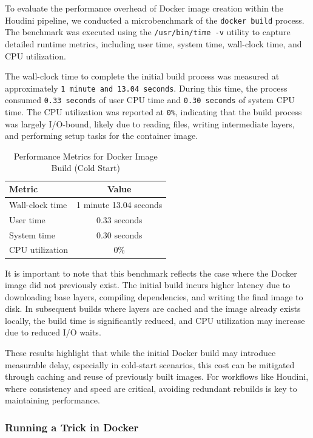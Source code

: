\documentclass[12pt]{report}
\begin{document}
\begin{doublespace}
To evaluate the performance overhead of Docker image creation within the Houdini pipeline, we conducted a microbenchmark of the \texttt{docker build} process. The benchmark was executed using the \texttt{/usr/bin/time -v} utility to capture detailed runtime metrics, including user time, system time, wall-clock time, and CPU utilization.

The wall-clock time to complete the initial build process was measured at approximately \texttt{1 minute and 13.04 seconds}. During this time, the process consumed \texttt{0.33 seconds} of user CPU time and \texttt{0.30 seconds} of system CPU time. The CPU utilization was reported at \texttt{0\%}, indicating that the build process was largely I/O-bound, likely due to reading files, writing intermediate layers, and performing setup tasks for the container image.

\begin{table}[h]
\centering
\caption{Performance Metrics for Docker Image Build (Cold Start)}
\label{tab:docker-build-performance}
\begin{tabular}{|l|c|}
\hline
\textbf{Metric}         & \textbf{Value} \\
\hline
Wall-clock time         & 1 minute 13.04 seconds \\
User time               & 0.33 seconds \\
System time             & 0.30 seconds \\
CPU utilization         & 0\% \\
\hline
\end{tabular}
\end{table}


It is important to note that this benchmark reflects the case where the Docker image did not previously exist. The initial build incurs higher latency due to downloading base layers, compiling dependencies, and writing the final image to disk. In subsequent builds where layers are cached and the image already exists locally, the build time is significantly reduced, and CPU utilization may increase due to reduced I/O waits.

These results highlight that while the initial Docker build may introduce measurable delay, especially in cold-start scenarios, this cost can be mitigated through caching and reuse of previously built images. For workflows like Houdini, where consistency and speed are critical, avoiding redundant rebuilds is key to maintaining performance.


\subsubsection{Running a Trick in Docker}


\end{doublespace}
\end{document}
